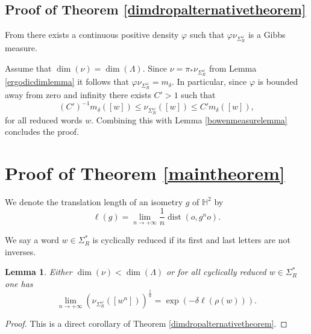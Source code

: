 \documentclass{article}
\newtheorem{lemma}{Lemma}
\DeclareMathOperator{\dist}{dist}
\renewcommand{\H}{\mathbb{H}}
\begin{document}
\subsection{Proof of Theorem \ref{dimdropalternativetheorem}}

From \cite[Proposition 3.2]{ledrappier} there exists a continuous positive density \(\varphi\) such that \(\varphi\nu_{\Sigma^\omega_R}\) is a Gibbs measure.

Assume that \(\dim(\nu) = \dim(\Lambda)\).  Since \(\nu = \pi_*\nu_{\Sigma^\omega_R}\) from Lemma \ref{ergodicdimlemma} it follows that \(\varphi\nu_{\Sigma^\omega_R} = m_\delta\).  In particular, since \(\varphi\) is bounded away from zero and infinity there exists \(C' > 1\) such that
\[(C')^{-1}m_{\delta}([w]) \le \nu_{\Sigma^\omega_R}([w]) \le C'm_{\delta}([w]),\]
for all reduced words \(w\).  Combining this with Lemma \ref{bowenmeasurelemma} concludes the proof.

\section{Proof of Theorem \ref{maintheorem}}

We denote the translation length of an isometry \(g\) of \(\H^2\) by
\[\ell(g) = \lim\limits_{n \to +\infty}\frac{1}{n}\dist(o,g^n o).\]

We say a word \(w \in \Sigma^*_R\) is cyclically reduced if its first and last letters are not inverses.

\begin{lemma}\label{cyclicallyreducedlemma}
  Either \(\dim(\nu) < \dim(\Lambda)\) or for all cyclically reduced \(w \in \Sigma^*_R\) one has
  \[\lim\limits_{n \to +\infty}\left(\nu_{\Sigma^\omega_R}([w^n])\right)^{\frac{1}{n}} = \exp(-\delta \ell(\rho(w))).\]
\end{lemma}
\begin{proof}
  This is a direct corollary of Theorem \ref{dimdropalternativetheorem}.
\end{proof}
\end{document}
